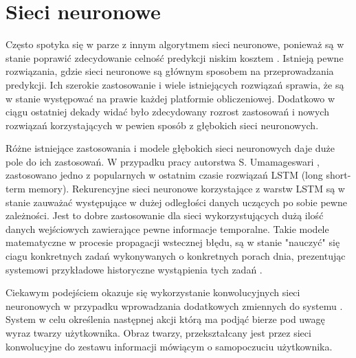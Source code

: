 

\section{Sieci neuronowe}


Często spotyka się w parze z innym algorytmem sieci neuronowe, ponieważ są w stanie poprawić zdecydowanie celność predykcji niskim kosztem \cite{episode_discovery_1}. Istnieją pewne rozwiązania, gdzie sieci neuronowe są głównym sposobem na przeprowadzania predykcji. Ich szerokie zastosowanie i wiele istniejących rozwiązań sprawia, że są w stanie występować na prawie każdej platformie obliczeniowej. Dodatkowo w ciągu ostatniej dekady widać było zdecydowany rozrost zastosowań i nowych rozwiązań korzystających w pewien sposób z głębokich sieci neuronowych.

Różne istniejące zastosowania i modele głębokich sieci neuronowych daje duże pole do ich zastosowań. W przypadku pracy autorstwa S. Umamageswari \cite{neural_1}, zastosowano jedno z popularnych w ostatnim czasie rozwiązań LSTM (long short-term memory). Rekurencyjne sieci neuronowe korzystające z warstw LSTM są w stanie zauważać występujące w dużej odległości danych uczących po sobie pewne zależności. Jest to dobre zastosowanie dla sieci wykorzystujących dużą ilość danych wejściowych zawierające pewne informacje temporalne. Takie modele matematyczne w procesie propagacji wstecznej błędu, są w stanie "nauczyć" się ciagu konkretnych zadań wykonywanych o konkretnych porach dnia, prezentując systemowi przykładowe historyczne wystąpienia tych zadań \cite{ksiazka_tf}.

Ciekawym podejściem okazuje się wykorzystanie konwolucyjnych sieci neuronowych w przypadku wprowadzania dodatkowych zmiennych do systemu \cite{conv_1}. System w celu określenia następnej akcji którą ma podjąć bierze pod uwagę wyraz twarzy użytkownika. Obraz twarzy, przekształcany jest przez sieci konwolucyjne do zestawu informacji mówiącym o samopoczuciu użytkownika.

